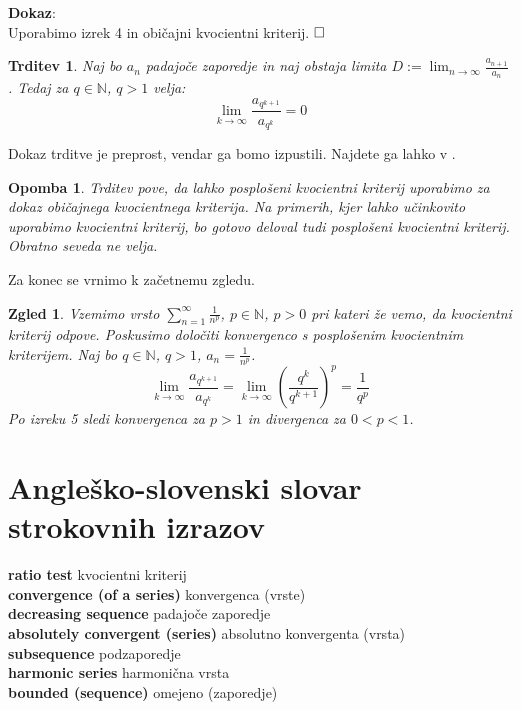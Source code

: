 \documentclass[a4paper,12pt]{article}
\def\N{\mathbb{N}} %
\newcommand{\geslo}[2]{\noindent\textbf{#1} \quad \hangindent=1cm #2\\[-1pc]}
\def\qed{$\hfill\Box$}   %
\newtheorem{trditev}{Trditev}
\newtheorem{opomba}{Opomba}
\newtheorem{zgled}{Zgled}
\begin{document}
\noindent
\textbf{Dokaz}:\\
Uporabimo izrek 4 in običajni kvocientni kriterij.
\qed

\begin{trditev}
    Naj bo $a_{n}$ padajoče zaporedje in naj obstaja limita
    $D := \lim_{n \to \infty}{\frac{a_{n + 1}}{a_n}}$. Tedaj za $q \in {\mathbb{N}}$, $q > 1$ velja:
    \[
        \lim_{k \to \infty}{\frac{a_{q^{k + 1}}}{a_{q^k}}} = 0
    \]
\end{trditev}

Dokaz trditve je preprost, vendar ga bomo izpustili. Najdete ga lahko v \cite{convergence}.

\begin{opomba}
    Trditev pove, da lahko posplošeni kvocientni kriterij uporabimo za dokaz običajnega
    kvocientnega kriterija. Na primerih, kjer lahko učinkovito uporabimo kvocientni kriterij,
    bo gotovo deloval tudi posplošeni kvocientni kriterij. Obratno seveda ne velja.
\end{opomba}

\noindent
Za konec se vrnimo k začetnemu zgledu.
\begin{zgled}
    Vzemimo vrsto $\sum_{n = 1}^{\infty}{\frac{1}{n^p}}$, $p \in \N$, $p > 0$ pri kateri
    že vemo, da kvocientni kriterij odpove. Poskusimo določiti konvergenco s posplošenim kvocientnim kriterijem.
    Naj bo $q \in \N$, $q > 1$, $a_n = \frac{1}{n^p}$.
    \[
            \lim_{k \to \infty}{\frac{a_{q^{k + 1}}}{a_{q^k}}} =
            \lim_{k \to \infty}{(\frac{q^k}{q^{k+1}})^p} = \frac{1}{q^p}
    \]
    Po izreku 5 sledi konvergenca za $p>1$ in divergenca za $ 0< p<1$.
\end{zgled}

\section{Angleško-slovenski slovar strokovnih izrazov}

\geslo{ratio test}{kvocientni kriterij}

\geslo{convergence (of a series)}{konvergenca (vrste)}

\geslo{decreasing sequence}{padajoče zaporedje}

\geslo{absolutely convergent (series)}{absolutno konvergenta (vrsta)}

\geslo{subsequence}{podzaporedje}

\geslo{harmonic series}{harmonična vrsta}

\geslo{bounded (sequence)}{omejeno (zaporedje)}
\end{document}
